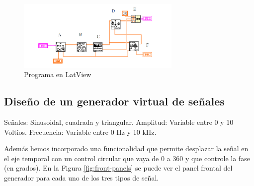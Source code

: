 \documentclass[10pt,a4paper,catalan]{article}
\begin{document}
\begin{figure}[H]
 \centering
 \includegraphics[width=0.7\textwidth]{capturas/ejercicio4}
 \caption{Programa en LatView}
 \label{fig:ej4}
\end{figure}

\subsection{Dise\~no de un generador virtual de se\~nales}

Se\~nales: Sinusoidal, cuadrada y triangular.
Amplitud: Variable entre 0 y 10 Voltios.
Frecuencia: Variable entre 0 Hz y 10 kHz.


Adem\'as hemos incorporado una funcionalidad que permite desplazar la se\~nal en el eje temporal con un control circular que vaya de 0 a 360 y que controle la fase (en grados). En la Figura \ref{fig:front-panels} se puede ver el panel frontal del generador para cada uno de los tres tipos de se\~nal.
\end{document}
